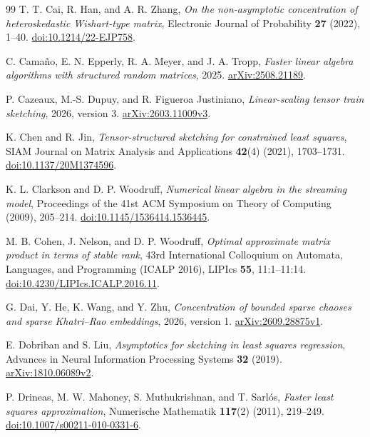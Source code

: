 \documentclass[11pt,a4paper]{article}
\theoremstyle{definition}\newtheorem{definition}[theorem]{Definition}
\theoremstyle{remark}\newtheorem{remark}[theorem]{Remark}
\numberwithin{equation}{section}
\begin{document}
\begin{thebibliography}{99}
T. T. Cai, R. Han, and A. R. Zhang,
\emph{On the non-asymptotic concentration of heteroskedastic Wishart-type matrix},
Electronic Journal of Probability \textbf{27} (2022), 1--40.
\href{https://doi.org/10.1214/22-EJP758}{doi:10.1214/22-EJP758}.

C. Cama\~no, E. N. Epperly, R. A. Meyer, and J. A. Tropp,
\emph{Faster linear algebra algorithms with structured random matrices},
2025. \href{https://arxiv.org/abs/2508.21189}{arXiv:2508.21189}.

P. Cazeaux, M.-S. Dupuy, and R. Figueroa Justiniano,
\emph{Linear-scaling tensor train sketching}, 2026, version 3.
\href{https://arxiv.org/abs/2603.11009v3}{arXiv:2603.11009v3}.

K. Chen and R. Jin,
\emph{Tensor-structured sketching for constrained least squares},
SIAM Journal on Matrix Analysis and Applications \textbf{42}(4) (2021),
1703--1731.
\href{https://doi.org/10.1137/20M1374596}{doi:10.1137/20M1374596}.

K. L. Clarkson and D. P. Woodruff,
\emph{Numerical linear algebra in the streaming model},
Proceedings of the 41st ACM Symposium on Theory of Computing (2009), 205--214.
\href{https://doi.org/10.1145/1536414.1536445}{doi:10.1145/1536414.1536445}.

M. B. Cohen, J. Nelson, and D. P. Woodruff,
\emph{Optimal approximate matrix product in terms of stable rank},
43rd International Colloquium on Automata, Languages, and Programming
(ICALP 2016), LIPIcs \textbf{55}, 11:1--11:14.
\href{https://doi.org/10.4230/LIPIcs.ICALP.2016.11}{doi:10.4230/LIPIcs.ICALP.2016.11}.

G. Dai, Y. He, K. Wang, and Y. Zhu,
\emph{Concentration of bounded sparse chaoses and sparse Khatri--Rao
embeddings}, 2026, version 1.
\href{https://arxiv.org/abs/2609.28875v1}{arXiv:2609.28875v1}.

E. Dobriban and S. Liu,
\emph{Asymptotics for sketching in least squares regression},
Advances in Neural Information Processing Systems \textbf{32} (2019).
\href{https://arxiv.org/abs/1810.06089v2}{arXiv:1810.06089v2}.

P. Drineas, M. W. Mahoney, S. Muthukrishnan, and T. Sarl\'os,
\emph{Faster least squares approximation},
Numerische Mathematik \textbf{117}(2) (2011), 219--249.
\href{https://doi.org/10.1007/s00211-010-0331-6}{doi:10.1007/s00211-010-0331-6}.


\end{thebibliography}
\end{document}
